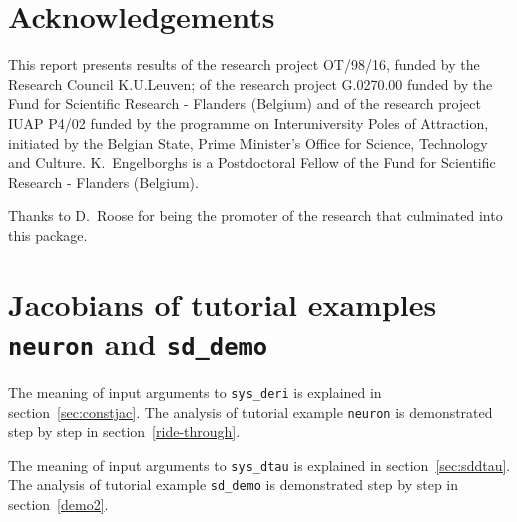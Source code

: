 \documentclass[10pt]{scrartcl}
\newcommand{\blist}[1]{\mbox{\lstinline!#1!}}
\begin{document}
{\section*{Acknowledgements}

This report presents results of the research project 
OT/98/16, funded by the Research Council K.U.Leuven;
of the research project G.0270.00 funded 
by the Fund for Scientific Research - Flanders (Belgium) and of the 
research project IUAP P4/02 funded by the programme
on Interuniversity Poles of Attraction, initiated by the Belgian State,
Prime Minister's Office for Science, Technology and Culture.
K.~Engelborghs is a Postdoctoral Fellow of the Fund for Scientific 
Research - Flanders (Belgium).

Thanks to D.~Roose for being the promoter of
the research that culminated into this package.





\newpage
\appendix

\section{Jacobians of tutorial examples \blist{neuron} and \blist{sd_demo}}
\label{sec:sys:deri}
The meaning of input arguments to \blist{sys_deri} is explained in
section~\ref{sec:constjac}. The analysis of tutorial example
\blist{neuron} is demonstrated step by step in section~\ref{ride-through}.



The meaning of input arguments to \blist{sys_dtau} is explained in
section~\ref{sec:sddtau}. The analysis of tutorial example
\blist{sd_demo} is demonstrated step by step in section~\ref{demo2}.
 \newpage

}
\end{document}
